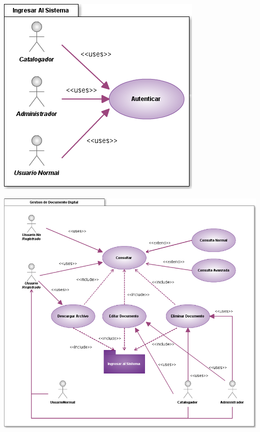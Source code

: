 \documentclass[]{article}
\begin{document}
	\begin{minipage}[c]{1\linewidth}
		\begin{center}
		\includegraphics[scale=.7]{casosUso/CU_IngresarSistema}		
		\end{center}
	\end{minipage}
	
	\begin{minipage}[c]{1\linewidth}
		\begin{center}
		\includegraphics[scale=.5]{casosUso/CU_GestionDocumentoDigital}
		\end{center}
	\end{minipage}
	
\end{document}

